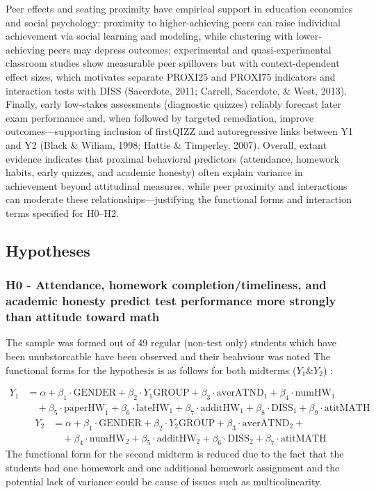 \documentclass[]{article}
\begin{document}
	Peer effects and seating proximity have empirical support in education economics and social psychology: proximity to higher-achieving peers can raise individual achievement via social learning and modeling, while clustering with lower-achieving peers may depress outcomes; experimental and quasi-experimental classroom studies show measurable peer spillovers but with context-dependent effect sizes, which motivates separate PROXI25 and PROXI75 indicators and interaction tests with DISS (Sacerdote, 2011; Carrell, Sacerdote, \& West, 2013). Finally, early low‑stakes assessments (diagnostic quizzes) reliably forecast later exam performance and, when followed by targeted remediation, improve outcomes—supporting inclusion of firstQIZZ and autoregressive links between Y1 and Y2 (Black \& Wiliam, 1998; Hattie \& Timperley, 2007). Overall, extant evidence indicates that proximal behavioral predictors (attendance, homework habits, early quizzes, and academic honesty) often explain variance in achievement beyond attitudinal measures, while peer proximity and interactions can moderate these relationships—justifying the functional forms and interaction terms specified for H0–H2.\\
	
	
	\subsection{Hypotheses}
	
	\subsubsection{H0 - Attendance, homework completion/timeliness, and academic
		honesty predict test performance more strongly than attitude toward
		math}
		The sample was formed out of 49 regular (non-test only) students which have been unubstorcatble have been observed and their beahviour was noted
		The functional forms for the hypothesis is as follows for both midterms ($Y_1 \& Y_2$) :
		
		$$
		\begin{aligned}
			Y_1 &= \alpha + \beta_1 \cdot \text{GENDER} + \beta_2 \cdot Y_1\text{GROUP} + \beta_3 \cdot \text{averATND}_1 + \beta_4 \cdot \text{numHW}_1 \\
			&\quad + \beta_5 \cdot \text{paperHW}_1 + \beta_6 \cdot \text{lateHW}_1 + \beta_7 \cdot \text{additHW}_1 + \beta_8 \cdot \text{DISS}_1 + \beta_9 \cdot \text{atitMATH}
		\end{aligned}
		$$
		$$
		\begin{aligned}
			Y_2 &= \alpha + \beta_1 \cdot \text{GENDER} + \beta_2 \cdot Y_2\text{GROUP}  + \beta_3 \cdot \text{averATND}_2 +   \\
			&\quad + \beta_4 \cdot \text{numHW}_2 + \beta_5 \cdot \text{additHW}_2 + \beta_6 \cdot \text{DISS}_2 + \beta_7 \cdot \text{atitMATH}
		\end{aligned}
		$$
		The functional form for the second midterm is reduced due to the fact that the students had one homework and one additional homework assignment and the potential lack of variance could be  cause of issues such as multicolinearity.
		
\end{document}
